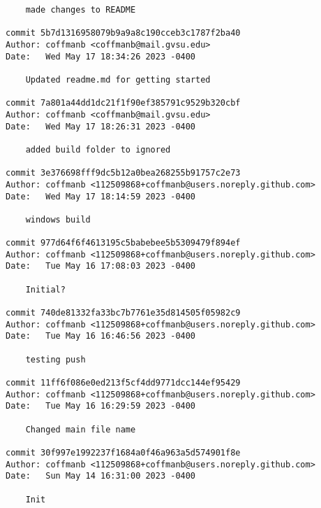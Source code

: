 \begin{verbatim}
    made changes to README

commit 5b7d1316958079b9a9a8c190cceb3c1787f2ba40
Author: coffmanb <coffmanb@mail.gvsu.edu>
Date:   Wed May 17 18:34:26 2023 -0400

    Updated readme.md for getting started

commit 7a801a44dd1dc21f1f90ef385791c9529b320cbf
Author: coffmanb <coffmanb@mail.gvsu.edu>
Date:   Wed May 17 18:26:31 2023 -0400

    added build folder to ignored

commit 3e376698fff9dc5b12a0bea268255b91757c2e73
Author: coffmanb <112509868+coffmanb@users.noreply.github.com>
Date:   Wed May 17 18:14:59 2023 -0400

    windows build

commit 977d64f6f4613195c5babebee5b5309479f894ef
Author: coffmanb <112509868+coffmanb@users.noreply.github.com>
Date:   Tue May 16 17:08:03 2023 -0400

    Initial?

commit 740de81332fa33bc7b7761e35d814505f05982c9
Author: coffmanb <112509868+coffmanb@users.noreply.github.com>
Date:   Tue May 16 16:46:56 2023 -0400

    testing push

commit 11ff6f086e0ed213f5cf4dd9771dcc144ef95429
Author: coffmanb <112509868+coffmanb@users.noreply.github.com>
Date:   Tue May 16 16:29:59 2023 -0400

    Changed main file name

commit 30f997e1992237f1684a0f46a963a5d574901f8e
Author: coffmanb <112509868+coffmanb@users.noreply.github.com>
Date:   Sun May 14 16:31:00 2023 -0400

    Init

\end{verbatim}


